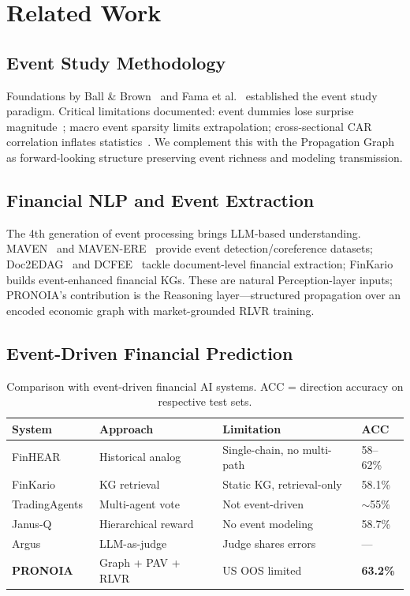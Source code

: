 \documentclass[sigconf, anonymous, review]{acmart}
\begin{document}
\section{Related Work}

\subsection{Event Study Methodology}

Foundations by Ball \& Brown~\cite{ball1968} and Fama et al.~\cite{fama1969} established the event study paradigm. Critical limitations documented: event dummies lose surprise magnitude~\cite{kuttner2001}; macro event sparsity limits extrapolation; cross-sectional CAR correlation inflates statistics~\cite{kolari2010}. We complement this with the Propagation Graph as forward-looking structure preserving event richness and modeling transmission.

\subsection{Financial NLP and Event Extraction}

The 4th generation of event processing brings LLM-based understanding. MAVEN~\cite{maven2020} and MAVEN-ERE~\cite{mavenere2022} provide event detection/coreference datasets; Doc2EDAG~\cite{doc2edag2019} and DCFEE~\cite{dcfee2018} tackle document-level financial extraction; FinKario~\cite{finkario2025} builds event-enhanced financial KGs. These are natural Perception-layer inputs; PRONOIA's contribution is the Reasoning layer---structured propagation over an encoded economic graph with market-grounded RLVR training.

\subsection{Event-Driven Financial Prediction}

\begin{table}[t]
\centering\small
\caption{Comparison with event-driven financial AI systems. ACC = direction accuracy on respective test sets.}
\label{tab:comparison}
\begin{tabular}{@{}llll@{}}
\toprule
System & Approach & Limitation & ACC \\
\midrule
FinHEAR~\cite{finhear2025} & Historical analog & Single-chain, no multi-path & 58--62\% \\
FinKario~\cite{finkario2025} & KG retrieval & Static KG, retrieval-only & 58.1\% \\
TradingAgents~\cite{tradingagents2024} & Multi-agent vote & Not event-driven & $\sim$55\% \\
Janus-Q~\cite{janusq2026} & Hierarchical reward & No event modeling & 58.7\% \\
Argus~\cite{argus2026} & LLM-as-judge & Judge shares errors & --- \\
\midrule
\textbf{PRONOIA} & Graph + PAV + RLVR & US OOS limited & \textbf{63.2\%} \\
\bottomrule
\end{tabular}
\end{table}
\end{document}
